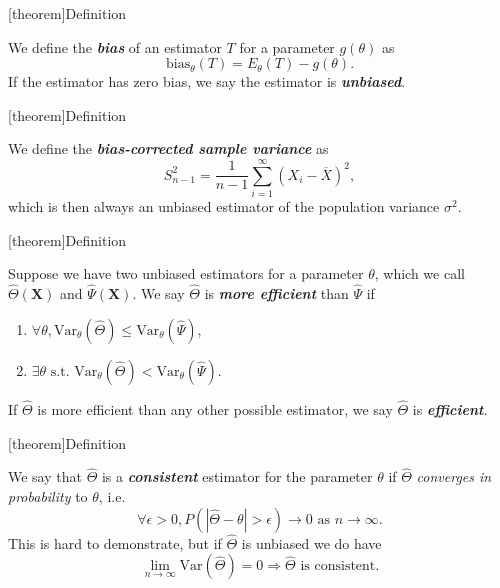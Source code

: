 \documentclass[12pt]{report}
\theoremstyle{definition}
\begin{document}
[theorem]{Definition}
\begin{bias}
    We define the \textbf{\emph{bias}} of an estimator $T$ for a parameter
    $g(\theta)$ as 
    \[
        \text{bias}_\theta(T)=E_\theta(T)-g(\theta).
    \]
    If the estimator has zero bias, we say the estimator is
    \textbf{\emph{unbiased}}.
\end{bias}

[theorem]{Definition}
\begin{bias-corrected sample variance}
    We define the \textbf{\emph{bias-corrected sample variance}} as
    \[
        S_{n-1}^2=\frac{1}{n-1}\sum_{i=1}^{\infty} {(X_i-\overline{X})}^{2},
    \]
    which is then always an unbiased estimator of the population variance
    $\sigma^{2}$.
\end{bias-corrected sample variance}

[theorem]{Definition}
\begin{efficiency}
    Suppose we have two unbiased estimators for a parameter $\theta$, which we
    call $\hat{\Theta}(\mathbf{X})$ and $\hat{\Psi}(\mathbf{X})$. 
    We say $\hat{\Theta}$ is \textbf{\emph{more efficient}} than $\hat{\Psi}$ if
    \begin{enumerate}
        \item $\forall\theta,
            \text{Var}_{\theta}(\hat{\Theta})\le\text{Var}_\theta(\hat{\Psi})$,
        \item $\exists\theta\text{ s.t.
            Var}_\theta(\hat{\Theta})<\text{Var}_\theta(\hat{\Psi})$.
    \end{enumerate} 
    If $\hat{\Theta}$ is more efficient than any other possible estimator, we
    say $\hat{\Theta}$ is \textbf{\emph{efficient}}.
\end{efficiency}

[theorem]{Definition}
\begin{consistency}
    We say that $\hat{\Theta}$ is a \textbf{\emph{consistent}} estimator for the
    parameter $\theta$ if $\hat{\Theta}$ \emph{converges in probability} to
    $\theta$, i.e.\
    \[
        \forall\epsilon>0,P(|\hat{\Theta}-\theta|>\epsilon)\rightarrow
        0 \text{ as }n\rightarrow\infty.
    \]
    This is hard to demonstrate, but if $\hat{\Theta}$ is unbiased we do have
    \[
        \lim_{n\rightarrow\infty}\text{Var}(\hat{\Theta})=0 \Longrightarrow 
        \hat{\Theta}\text{ is consistent.}
    \]
\end{consistency}
\end{document}
